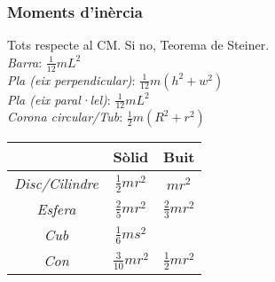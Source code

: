 \documentclass[10pt]{article}
\begin{document}
\begin{multicols}{4}
\subsubsection*{Moments d'inèrcia}
Tots respecte al CM. Si no, Teorema de Steiner.\\
\emph{Barra}: $\frac{1}{12}mL^2$ \\
\emph{Pla (eix perpendicular)}: $\frac{1}{12}m(h^2+w^2)$ \\
\emph{Pla (eix paral·lel)}: $\frac{1}{12}mL^2$ \\
\emph{Corona circular/Tub}: $\frac{1}{2}m(R^2+r^2)$\\
\begin{center}
    \begin{tabular}{|c|c|c|} 
        \hline
        & Sòlid & Buit \\
        \hline
        \emph{Disc/Cilindre} & $\frac{1}{2} mr^2$ & $mr^2$ \\ 
        \emph{Esfera} & $\frac{2}{5} mr^2$ & $\frac{2}{3} mr^2$ \\ 
        \emph{Cub} & $\frac{1}{6} ms^2$ & \\ 
        \emph{Con} & $\frac{3}{10} mr^2$ & $\frac{1}{2} mr^2$\\
        \hline
    \end{tabular}
\end{center}
  

\end{multicols}
\end{document}
